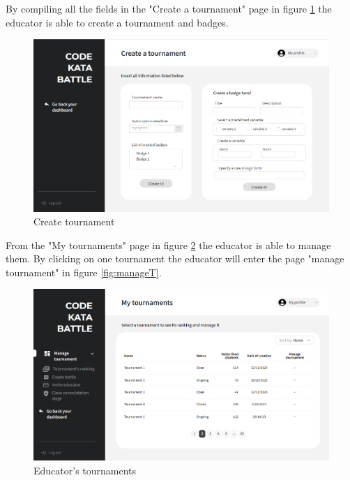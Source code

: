 By compiling all the fields in the "Create a tournament" page in figure \ref{fig:createT} the educator is able to create a tournament and badges.
\begin{figure}[h]
    \centering
    \includegraphics[width=\textwidth]{images/mockups/educators/createT.png}
    \caption{Create tournament}
    \label{fig:createT}
\end{figure}
\clearpage

From the "My tournaments" page in figure \ref{fig:EmyT} the educator is able to manage them. By clicking on one tournament the educator will enter the page "manage tournament" in figure \ref{fig:manageT}.
\begin{figure}[h]
    \centering
    \includegraphics[width=\textwidth]{images/mockups/educators/MyTournaments.png}
    \caption{Educator's tournaments}
    \label{fig:EmyT}
\end{figure}

